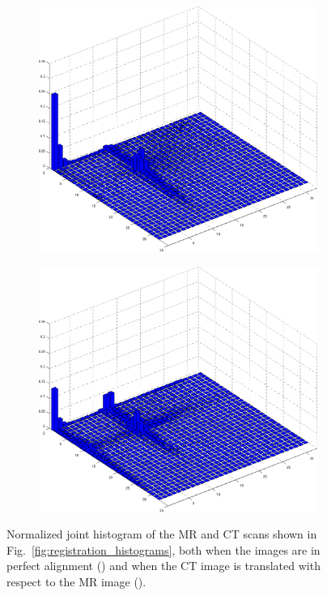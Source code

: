 \documentclass[10pt,twoside]{book}
\begin{document}
\begin{figure}
  \centering
  \begin{subfigure}{0.8\textwidth}
     \includegraphics[width=\textwidth]{snapshot_plots__doInterModality_1__doMutualInformation_1__xOffset_0__pdf}
     \caption{}
     \label{fig:registration_histograms_blurring_perfect}
  \end{subfigure}
  \begin{subfigure}{0.8\textwidth}
     \includegraphics[width=\textwidth]{snapshot_plots__doInterModality_1__doMutualInformation_1__xOffset_-80__pdf}
     \caption{}
     \label{fig:registration_histograms_blurring_off}
  \end{subfigure}
  \caption{%
  Normalized joint histogram of the MR and CT scans shown in Fig.~\ref{fig:registration_histograms}, both when the images are in perfect alignment () 
  and when the CT image is translated with respect to the MR image
  ().
  }
  \label{fig:registration_histograms_blurring}
\end{figure}
\end{document}
